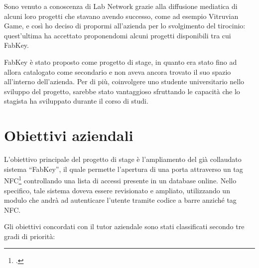 

\medskip

Sono venuto a conoscenza di Lab Network grazie alla diffusione mediatica di alcuni loro progetti che stavano avendo successo, come ad esempio Vitruvian Game, e così ho deciso di propormi all'azienda per lo svolgimento del tirocinio: quest'ultima ha accettato proponendomi alcuni progetti disponibili tra cui FabKey.


\medskip

FabKey è stato proposto come progetto di stage, in quanto era stato fino ad allora catalogato come secondario e non aveva ancora trovato il suo spazio all'interno dell'azienda. Per di più, coinvolgere uno studente universitario nello sviluppo del progetto, sarebbe stato vantaggioso sfruttando le capacità che lo stagista ha sviluppato durante il corso di studi.

\section{Obiettivi aziendali}\label{obaz}
L'obiettivo principale del progetto di stage è l'ampliamento del già collaudato sistema ``FabKey'', il quale permette l'apertura di una porta attraverso un tag NFC\footcite{Near Field Communication, ossia comunicazione di prossimita'} controllando una lista di accessi presente in un database online. Nello specifico, tale sistema doveva essere revisionato e ampliato, utilizzando un modulo che andrà ad autenticare l'utente tramite codice a barre anziché tag NFC.

Gli obiettivi concordati con il tutor aziendale sono stati classificati secondo tre gradi di priorità:

